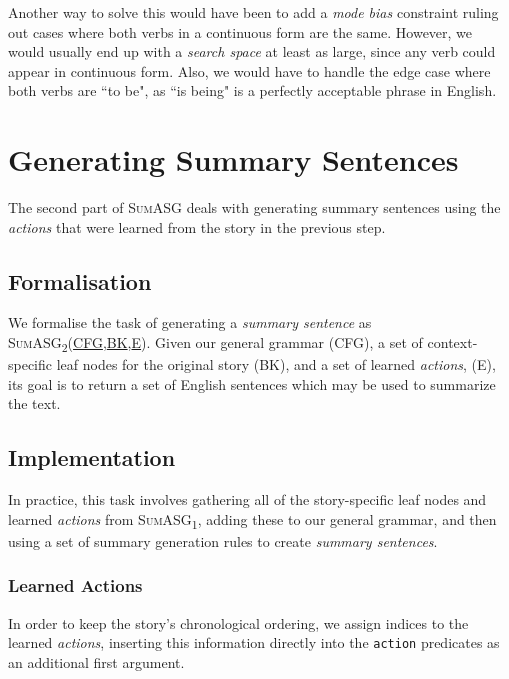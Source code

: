 \noindent
Another way to solve this would have been to add a \textit{mode bias} constraint ruling out cases where both verbs in a continuous form are the same. However, we would usually end up with a \textit{search space} at least as large, since any verb could appear in continuous form. Also, we would have to handle the edge case where both verbs are ``to be", as ``is being" is a perfectly acceptable phrase in English.

\section{Generating Summary Sentences}
\label{sec:gen_summary_sentences}

The second part of \textsc{SumASG} deals with generating summary sentences using the \textit{actions} that were learned from the story in the previous step.

\subsection{Formalisation}

We formalise the task of generating a \textit{summary sentence} as \textsc{SumASG\textsubscript{2}(\underline{CFG},\underline{BK},\underline{E})}. Given our general grammar (\textsc{CFG}), a set of context-specific leaf nodes for the original story (\textsc{BK}), and a set of learned \textit{actions}, (\textsc{E}), its goal is to return a set of English sentences which may be used to summarize the text.

\subsection{Implementation}

In practice, this task involves gathering all of the story-specific leaf nodes and learned \textit{actions} from \textsc{SumASG\textsubscript{1}}, adding these to our general grammar, and then using a set of summary generation rules to create \textit{summary sentences}.

\subsubsection*{Learned Actions}

In order to keep the story's chronological ordering, we assign indices to the learned \textit{actions}, inserting this information directly into the \texttt{action} predicates as an additional first argument.

